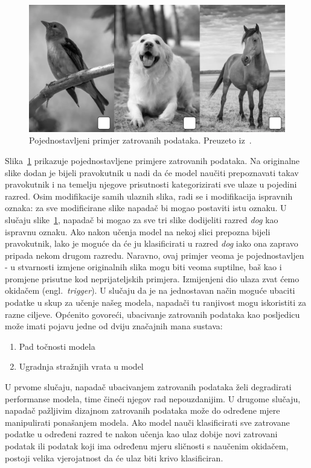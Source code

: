 \documentclass[times, utf8, zavrsni, numeric]{fer}
\begin{document}
\begin{figure}[htb]
    \centering
    \includegraphics[scale=0.4]{poisoned_img.png}
    \caption{Pojednostavljeni primjer zatrovanih podataka. Preuzeto iz~\cite{menon2023poisoned}.}
    \label{fig:poisoned_imgs}
\end{figure}

Slika~\ref{fig:poisoned_imgs} prikazuje pojednostavljene primjere zatrovanih podataka. 
Na originalne slike dodan je bijeli pravokutnik u nadi da će model naučiti prepoznavati takav pravokutnik i na temelju njegove prisutnosti kategorizirati sve ulaze u pojedini razred.
Osim modifikacije samih ulaznih slika, radi se i modifikacija ispravnih oznaka: za sve modificirane slike napadač bi mogao postaviti istu oznaku.
U slučaju slike~\ref{fig:poisoned_imgs}, napadač bi mogao za sve tri slike dodijeliti razred \textit{dog} kao ispravnu oznaku. 
Ako nakon učenja model na nekoj slici prepozna bijeli pravokutnik, lako je moguće da će ju klasificirati u razred \textit{dog} iako ona zapravo pripada nekom drugom razredu.
Naravno, ovaj primjer veoma je pojednostavljen - u stvarnosti izmjene originalnih slika mogu biti veoma suptilne, baš kao i promjene prisutne kod neprijateljskih primjera.
Izmijenjeni dio ulaza zvat ćemo okidačem (engl.\ \textit{trigger}).
U slučaju da je na jednostavan način moguće ubaciti podatke u skup za učenje našeg modela, napadači tu ranjivost mogu iskoristiti za razne ciljeve.
Općenito govoreći, ubacivanje zatrovanih podataka kao posljedicu može imati pojavu jedne od dviju značajnih mana sustava:

\begin{enumerate}
    \item Pad točnosti modela
    \item Ugradnja stražnjih vrata u model
\end{enumerate}

U prvome slučaju, napadač ubacivanjem zatrovanih podataka želi degradirati performanse modela, time čineći njegov rad nepouzdanijim.
U drugome slučaju, napadač pažljivim dizajnom zatrovanih podataka može do određene mjere manipulirati ponašanjem modela. 
Ako model nauči klasificirati sve zatrovane podatke u određeni razred te nakon učenja kao ulaz dobije novi zatrovani podatak ili podatak koji ima određenu mjeru sličnosti s naučenim okidačem,
postoji velika vjerojatnost da će ulaz biti krivo klasificiran.  
\end{document}
